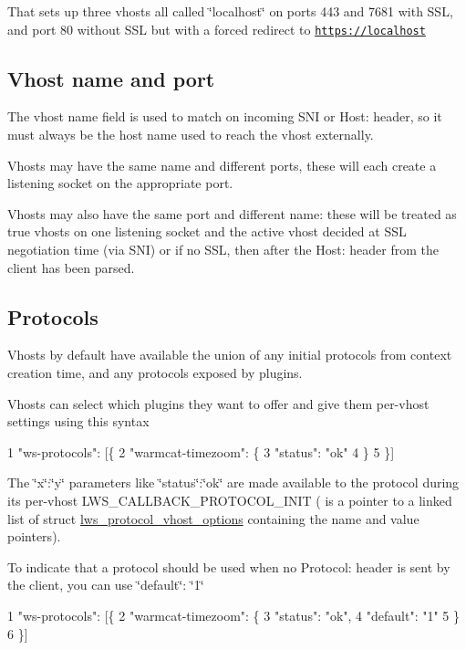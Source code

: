 That sets up three vhosts all called \char`\"{}localhost\char`\"{} on ports 443 and 7681 with S\+SL, and port 80 without S\+SL but with a forced redirect to \href{https://localhost}{\tt https\+://localhost}

\subsection*{Vhost name and port }

The vhost name field is used to match on incoming S\+NI or Host\+: header, so it must always be the host name used to reach the vhost externally.


\begin{DoxyItemize}
\item Vhosts may have the same name and different ports, these will each create a listening socket on the appropriate port.
\item Vhosts may also have the same port and different name\+: these will be treated as true vhosts on one listening socket and the active vhost decided at S\+SL negotiation time (via S\+NI) or if no S\+SL, then after the Host\+: header from the client has been parsed.
\end{DoxyItemize}

\subsection*{Protocols }

Vhosts by default have available the union of any initial protocols from context creation time, and any protocols exposed by plugins.

Vhosts can select which plugins they want to offer and give them per-\/vhost settings using this syntax 
\begin{DoxyCode}
1 "ws-protocols": [\{
2   "warmcat-timezoom": \{
3     "status": "ok"
4   \}
5 \}]
\end{DoxyCode}


The \char`\"{}x\char`\"{}\+:\char`\"{}y\char`\"{} parameters like \char`\"{}status\char`\"{}\+:\char`\"{}ok\char`\"{} are made available to the protocol during its per-\/vhost L\+W\+S\+\_\+\+C\+A\+L\+L\+B\+A\+C\+K\+\_\+\+P\+R\+O\+T\+O\+C\+O\+L\+\_\+\+I\+N\+IT ( is a pointer to a linked list of struct \hyperlink{structlws__protocol__vhost__options}{lws\+\_\+protocol\+\_\+vhost\+\_\+options} containing the name and value pointers).

To indicate that a protocol should be used when no Protocol\+: header is sent by the client, you can use \char`\"{}default\char`\"{}\+: \char`\"{}1\char`\"{} 
\begin{DoxyCode}
1 "ws-protocols": [\{
2   "warmcat-timezoom": \{
3     "status": "ok",
4     "default": "1"
5   \}
6 \}]
\end{DoxyCode}


